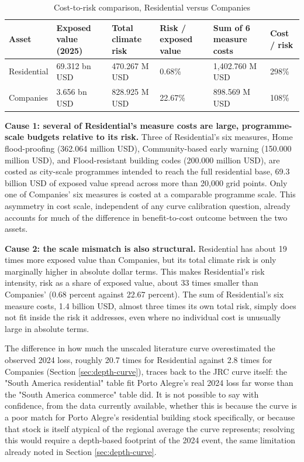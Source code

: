 \documentclass[11pt]{article}
\begin{document}
\begin{table}[H]
\centering
\caption{Cost-to-risk comparison, Residential versus Companies}
\label{tab:rootcause}
\small
\begin{tabular}{lp{2cm}p{2cm}p{2cm}p{2.2cm}p{1.5cm}}
\toprule
Asset & Exposed value (2025) & Total climate risk & Risk / exposed value & Sum of 6 measure costs & Cost / risk \\
\midrule
Residential & 69.312 bn USD & 470.267 M USD & 0.68\% & 1{,}402.760 M USD & 298\% \\
Companies & 3.656 bn USD & 828.925 M USD & 22.67\% & 898.569 M USD & 108\% \\
\bottomrule
\end{tabular}
\end{table}

\textbf{Cause 1: several of Residential's measure costs are large, programme-scale budgets
relative to its risk.} Three of Residential's six measures, Home flood-proofing (362.064
million USD), Community-based early warning (150.000 million USD), and Flood-resistant
building codes (200.000 million USD), are costed as city-scale programmes intended to reach
the full residential base, 69.3 billion USD of exposed value spread across more than 20,000
grid points. Only one of Companies' six measures is costed at a comparable programme scale.
This asymmetry in cost scale, independent of any curve calibration question, already
accounts for much of the difference in benefit-to-cost outcome between the two assets.

\textbf{Cause 2: the scale mismatch is also structural.} Residential has about 19 times
more exposed value than Companies, but its total climate risk is only marginally higher in
absolute dollar terms. This makes Residential's risk intensity, risk as a share of exposed
value, about 33 times smaller than Companies' (0.68 percent against 22.67 percent). The sum
of Residential's six measure costs, 1.4 billion USD, almost three times its own total risk,
simply does not fit inside the risk it addresses, even where no individual cost is
unusually large in absolute terms.

The difference in how much the unscaled literature curve overestimated the observed 2024
loss, roughly 20.7 times for Residential against 2.8 times for Companies (Section
\ref{sec:depth-curve}), traces back to the JRC curve itself: the "South America
residential" table fit Porto Alegre's real 2024 loss far worse than the "South America
commerce" table did. It is not possible to say with confidence, from the data currently
available, whether this is because the curve is a poor match for Porto Alegre's residential
building stock specifically, or because that stock is itself atypical of the regional
average the curve represents; resolving this would require a depth-based footprint of the
2024 event, the same limitation already noted in Section \ref{sec:depth-curve}.
\end{document}
